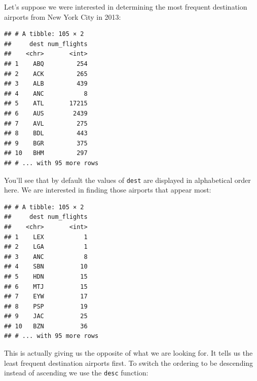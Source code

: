 \documentclass[]{tufte-book}
\newenvironment{Shaded}{\begin{snugshade}}{\end{snugshade}}
\newcommand{\KeywordTok}[1]{\textcolor[rgb]{0.13,0.29,0.53}{\textbf{{#1}}}}
\newcommand{\DataTypeTok}[1]{\textcolor[rgb]{0.13,0.29,0.53}{{#1}}}
\newcommand{\StringTok}[1]{\textcolor[rgb]{0.31,0.60,0.02}{{#1}}}
\newcommand{\NormalTok}[1]{{#1}}
\theoremstyle{definition}
\theoremstyle{definition}
\theoremstyle{remark}
\begin{document}
Let's suppose we were interested in determining the most frequent
destination airports from New York City in 2013:

\begin{Shaded}
\end{Shaded}

\begin{verbatim}
## # A tibble: 105 × 2
##     dest num_flights
##    <chr>       <int>
## 1    ABQ         254
## 2    ACK         265
## 3    ALB         439
## 4    ANC           8
## 5    ATL       17215
## 6    AUS        2439
## 7    AVL         275
## 8    BDL         443
## 9    BGR         375
## 10   BHM         297
## # ... with 95 more rows
\end{verbatim}

You'll see that by default the values of \texttt{dest} are displayed in
alphabetical order here. We are interested in finding those airports
that appear most:

\begin{Shaded}
\end{Shaded}

\begin{verbatim}
## # A tibble: 105 × 2
##     dest num_flights
##    <chr>       <int>
## 1    LEX           1
## 2    LGA           1
## 3    ANC           8
## 4    SBN          10
## 5    HDN          15
## 6    MTJ          15
## 7    EYW          17
## 8    PSP          19
## 9    JAC          25
## 10   BZN          36
## # ... with 95 more rows
\end{verbatim}

This is actually giving us the opposite of what we are looking for. It
tells us the least frequent destination airports first. To switch the
ordering to be descending instead of ascending we use the \texttt{desc}
function:

\begin{Shaded}
\end{Shaded}
\end{document}

